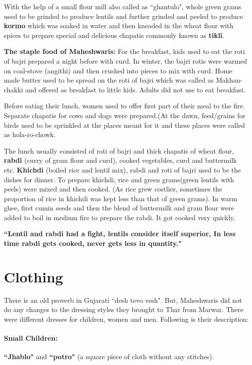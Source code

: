 With the help of a small flour mill also called as ``ghantulo", whole green
grams used to be grinded to produce lentils and further grinded and peeled to
produce \textbf{kormo} which was soaked in water and then kneaded in the wheat
flour with spices to prepare special and delicious chapatis commonly known as
\textbf{tikli}.

\textbf{The staple food of Maheshwaris:} For the breakfast, kids used to eat the
roti of bajri prepared a night before with curd. In winter, the bajri rotis were
warmed on coal-stove (angithi) and then crushed into pieces to mix with curd.
Home made butter used to be spread on the roti of bajri which was called as
Makhan-chakki and offered as breakfast to little kids. Adults did not use to eat
breakfast.

Before eating their lunch, women used to offer first part of their meal to the
fire. Separate chapatis for cows and dogs were prepared.(At the dawn,
feed/grains for birds used to be sprinkled at the places meant for it and these
places were called as hola-ro-chowk.

The lunch usually consisted of roti of bajri and thick chapatis of wheat flour,
\textbf{rabdi} (curry of gram flour and curd), cooked vegetables, curd and
buttermilk etc. \textbf{Khichdi} (boiled rice and lentil mix), rabdi and roti of
bajri used to be the dishes for dinner. To prepare khichdi, rice and green
grams(green lentils with peels) were mixed and then cooked. (As rice grew
costlier, sometimes the proportion of rice in khichdi was kept less than that of
green grams). In warm ghee, first cumin seeds and then the blend of buttermilk
and gram flour were added to boil in medium fire to prepare the rabdi. It got
cooked very quickly.

\textbf{``Lentil and rabdi had a fight, lentils consider itself superior, In
less time rabdi gets cooked, never gets less in quantity."}

\section{Clothing}
There is an old proverb in Gujarati ``desh tevo vesh". But, Maheshwaris did not
do any changes to the dressing styles they brought to Thar from Marwar. There
were different dresses for children, women and men. Following is their
description:
\paragraph{Small Children:} \textbf{``Jhablo"} and \textbf{``potro"} (a square piece of cloth without any stitches).
